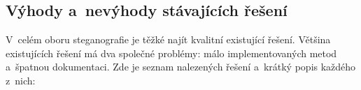 


\subsection*{Výhody a~nevýhody stávajících řešení}
\label{sub:pros-cons-existing-solutions}

V~celém oboru steganografie je těžké najít kvalitní existující řešení. Většina
existujících řešení má dva společné problémy: málo implementovaných metod
a~špatnou dokumentaci. Zde je seznam nalezených řešení a~krátký popis každého
z~nich:

